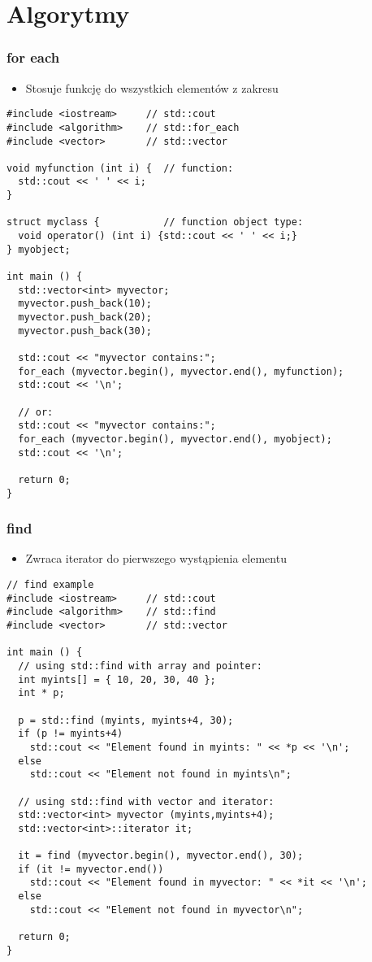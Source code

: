 \documentclass[10pt]{beamer}
\begin{document}
\section{Algorytmy}

\begin{frame}[fragile]
  \frametitle{for each}
    \begin{itemize} 
    \item Stosuje funkcję do wszystkich elementów z zakresu
  \end{itemize}
  \begin{lstlisting}
#include <iostream>     // std::cout
#include <algorithm>    // std::for_each
#include <vector>       // std::vector

void myfunction (int i) {  // function:
  std::cout << ' ' << i;
}

struct myclass {           // function object type:
  void operator() (int i) {std::cout << ' ' << i;}
} myobject;

int main () {
  std::vector<int> myvector;
  myvector.push_back(10);
  myvector.push_back(20);
  myvector.push_back(30);

  std::cout << "myvector contains:";
  for_each (myvector.begin(), myvector.end(), myfunction);
  std::cout << '\n';

  // or:
  std::cout << "myvector contains:";
  for_each (myvector.begin(), myvector.end(), myobject);
  std::cout << '\n';

  return 0;
}
  \end{lstlisting}
\end{frame}

\begin{frame}[fragile]
  \frametitle{find}
  \begin{itemize} 
    \item Zwraca iterator do pierwszego wystąpienia elementu
  \end{itemize}
  \begin{lstlisting}
// find example
#include <iostream>     // std::cout
#include <algorithm>    // std::find
#include <vector>       // std::vector

int main () {
  // using std::find with array and pointer:
  int myints[] = { 10, 20, 30, 40 };
  int * p;

  p = std::find (myints, myints+4, 30);
  if (p != myints+4)
    std::cout << "Element found in myints: " << *p << '\n';
  else
    std::cout << "Element not found in myints\n";

  // using std::find with vector and iterator:
  std::vector<int> myvector (myints,myints+4);
  std::vector<int>::iterator it;

  it = find (myvector.begin(), myvector.end(), 30);
  if (it != myvector.end())
    std::cout << "Element found in myvector: " << *it << '\n';
  else
    std::cout << "Element not found in myvector\n";

  return 0;
}
  \end{lstlisting}
\end{frame}
\end{document}
